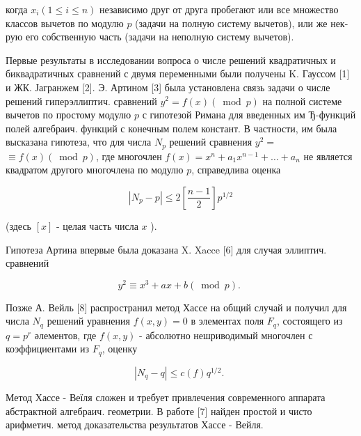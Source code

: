 \documentclass[10pt]{article}
\begin{document}
когда $x_{i}(1 \leqslant i \leqslant n)$ независимо друг от друга пробегают или все множество классов вычетов по модулю $p$ (задачи на полную систему вычетов), или же нек-рую его собственную часть (задачи на неполную систему вычетов).



Первые результаты в исследовании вопроса о числе решений квадратичных и биквадратичных сравнений с двумя переменными были получены K. Гауссом [1] и ЖК. Јагранжем [2]. Э. Артином [3] была установлена связь задачи о числе решений гиперэллиптич. сравнений $y^{2}=f(x)(\bmod p)$ на полной системе вычетов по простому модулю $p$ с гипотезой Римана для введенных им Ђ-функций полей алгебраич. функций с конечным полем констант. В частности, им была высказана гипотеза, что для числа $N_{p}$ решений сравнения $y^{2}=$ $\equiv f(x)(\bmod p)$, где многочлен $f(x)=x^{n}+a_{1} x^{n-1}+\ldots+a_{n}$ не является квадратом другого многочлена по модулю $p$, справедлива оценка



\[

\left|N_{p}-p\right| \leqslant 2\left[\frac{n-1}{2}\right] p^{1 / 2}

\]



(здесь $[x]$ - целая часть числа $x$ ).



Гипотеза Артина впервые была доказана X. Xacce [6] для случая эллиптич. сравнений



\[

y^{2} \equiv x^{3}+a x+b(\bmod p) \text {. }

\]



Позже А. Вейль [8] распространил метод Хассе на общий случай и получил для числа $N_{q}$ решений уравнения $f(x, y)=0$ в элементах поля $F_{q}$, состоящего из $q=p^{r}$ әлементов, где $f(x, y)$ - абсолютно нешриводимый многочлен с коэффициентами из $F_{q}$, оценку



\[

\left|N_{q}-q\right| \leqslant c(f) q^{1 / 2} \text {. }

\]



Метод Хассе - Веїля сложен и требует привлечения современного аппарата абстрактной алгебраич. геометрии. В работе [7] найден простой и чисто арифметич. метод доказательства результатов Хассе - Вейля.
\end{document}
